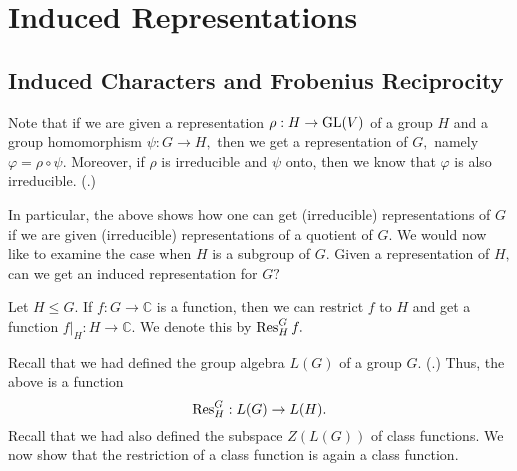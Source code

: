 \section{Induced Representations} \label{sec:05}
\subsection{Induced Characters and Frobenius Reciprocity}

Note that if we are given a representation $\rho : H \to \operatorname{GL}(V)$ of a group $H$ and a group homomorphism $\psi : G \to H,$ then we get a representation of $G,$ namely $\varphi = \rho \circ \psi.$ Moreover, if $\rho$ is irreducible and $\psi$ onto, then we know that $\varphi$ is also irreducible. (.) 

In particular, the above shows how one can get (irreducible) representations of $G$ if we are given (irreducible) representations of a quotient of $G.$ We would now like to examine the case when $H$ is a subgroup of $G.$ Given a representation of $H,$ can we get an induced representation for $G?$

\begin{defn}%
	Let $H \le G.$ If $f : G \to \mathbb{C}$ is a function, then we can restrict $f$ to $H$ and get a function $f|_H : H \to \mathbb{C}.$ We denote this  by $\operatorname{Res}^{G}_{H}f.$
\end{defn}

Recall that we had defined the group algebra $L(G)$ of a group $G.$ (.) Thus, the above is a function
\begin{equation*} 
	\operatorname{Res}^{G}_{H} : L(G) \to L(H).
\end{equation*}
Recall that we had also defined the subspace $Z(L(G))$ of class functions. We now show that the restriction of a class function is again a class function.

